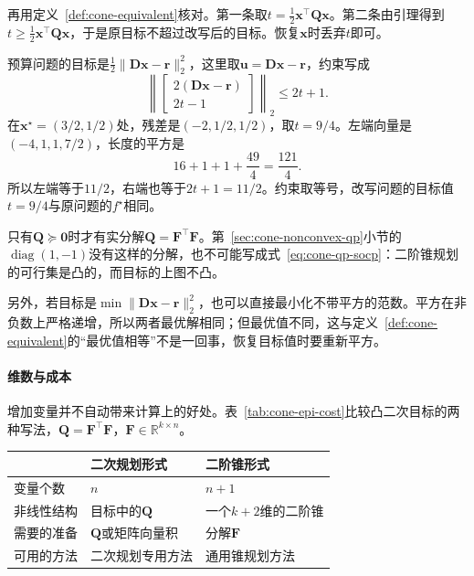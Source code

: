 再用定义~\ref{def:cone-equivalent}核对。第一条取$t=\frac12\bm{x}^\top\bm{Q}\bm{x}$。第二条由引理得到$t\geq\frac12\bm{x}^\top\bm{Q}\bm{x}$，于是原目标不超过改写后的目标。恢复$\bm{x}$时丢弃$t$即可。

\begin{example}[预算问题的二阶锥形式]
\label{ex:cone-budget-socp}
预算问题的目标是$\frac12\lVert\bm{D}\bm{x}-\bm{r}\rVert_2^2$，这里取$\bm{u}=\bm{D}\bm{x}-\bm{r}$，约束写成
\[
 \left\lVert\begin{bmatrix}2(\bm{D}\bm{x}-\bm{r})\\2t-1\end{bmatrix}\right\rVert_2\leq2t+1.
\]
在$\bm{x}^\star=(3/2,1/2)$处，残差是$(-2,1/2,1/2)$，取$t=9/4$。左端向量是$(-4,1,1,7/2)$，长度的平方是
\[
 16+1+1+\frac{49}{4}=\frac{121}{4}.
\]
所以左端等于$11/2$，右端也等于$2t+1=11/2$。约束取等号，改写问题的目标值$t=9/4$与原问题的$f^\star$相同。
\end{example}

只有$\bm{Q}\succeq\bm{0}$时才有实分解$\bm{Q}=\bm{F}^\top\bm{F}$。第~\ref{sec:cone-nonconvex-qp}小节的$\operatorname{diag}(1,-1)$没有这样的分解，也不可能写成式~\eqref{eq:cone-qp-socp}：二阶锥规划的可行集是凸的，而目标的上图不凸。

另外，若目标是$\min\lVert\bm{D}\bm{x}-\bm{r}\rVert_2^2$，也可以直接最小化不带平方的范数。平方在非负数上严格递增，所以两者最优解相同；但最优值不同，这与定义~\ref{def:cone-equivalent}的“最优值相等”不是一回事，恢复目标值时要重新平方。

\paragraph{维数与成本}
增加变量并不自动带来计算上的好处。表~\ref{tab:cone-epi-cost}比较凸二次目标的两种写法，$\bm{Q}=\bm{F}^\top\bm{F}$，$\bm{F}\in\mathbb{R}^{k\times n}$。

\begin{BookInlineTable}
  \centering
  \begin{tabular}{lll}
    \toprule
    & 二次规划形式 & 二阶锥形式\\
    \midrule
    变量个数 & $n$ & $n+1$\\
    非线性结构 & 目标中的$\bm{Q}$ & 一个$k+2$维的二阶锥\\
    需要的准备 & $\bm{Q}$或矩阵向量积 & 分解$\bm{F}$\\
    可用的方法 & 二次规划专用方法 & 通用锥规划方法\\
    \bottomrule
  \end{tabular}
  \caption{同一凸二次目标的两种写法。}
  \label{tab:cone-epi-cost}
\end{BookInlineTable}

